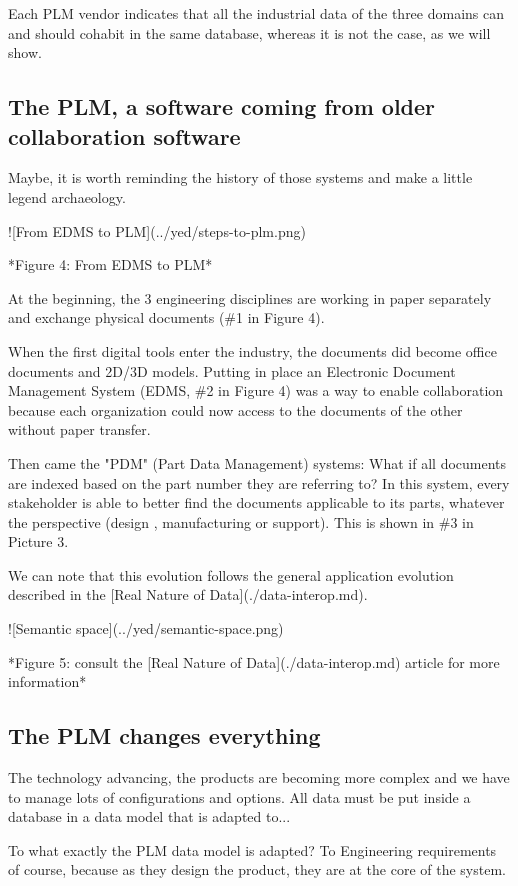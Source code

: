 \documentclass[]{article}
\begin{document}
Each PLM vendor indicates that all the industrial data of the three domains can and should cohabit in the same database, whereas it is not the case, as we will show.

\subsection{The PLM, a software coming from older collaboration software}

Maybe, it is worth reminding the history of those systems and make a little legend archaeology.

![From EDMS to PLM](../yed/steps-to-plm.png)

*Figure 4: From EDMS to PLM*

At the beginning, the 3 engineering disciplines are working in paper separately and exchange physical documents (\#1 in Figure 4).

When the first digital tools enter the industry, the documents did become office documents and 2D/3D models. Putting in place an Electronic Document Management System (EDMS, \#2 in Figure 4) was a way to enable collaboration because each organization could now access to the documents of the other without paper transfer.

Then came the "PDM" (Part Data Management) systems: What if all documents are indexed based on the part number they are referring to? In this system, every stakeholder is able to better find the documents applicable to its parts, whatever the perspective (design , manufacturing or support). This is shown in \#3 in Picture 3.

We can note that this evolution follows the general application evolution described in the [Real Nature of Data](./data-interop.md).

![Semantic space](../yed/semantic-space.png)

*Figure 5: consult the [Real Nature of Data](./data-interop.md) article for more information*

\subsection{The PLM changes everything}

The technology advancing, the products are becoming more complex and we have to manage lots of configurations and options. All data must be put inside a database in a data model that is adapted to...

To what exactly the PLM data model is adapted? To Engineering requirements of course, because as they design the product, they are at the core of the system.
\end{document}
